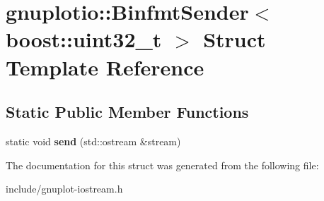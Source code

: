 \hypertarget{structgnuplotio_1_1BinfmtSender_3_01boost_1_1uint32__t_01_4}{}\section{gnuplotio\+:\+:Binfmt\+Sender$<$ boost\+:\+:uint32\+\_\+t $>$ Struct Template Reference}
\label{structgnuplotio_1_1BinfmtSender_3_01boost_1_1uint32__t_01_4}
\subsection*{Static Public Member Functions}
\begin{DoxyCompactItemize}
\item 
\mbox{\label{structgnuplotio_1_1BinfmtSender_3_01boost_1_1uint32__t_01_4_a134bce57dc5bb3e06c1b369a9826403b}} 
static void {\bfseries send} (std\+::ostream \&stream)
\end{DoxyCompactItemize}


The documentation for this struct was generated from the following file\+:\begin{DoxyCompactItemize}
\item 
include/gnuplot-\/iostream.\+h\end{DoxyCompactItemize}
